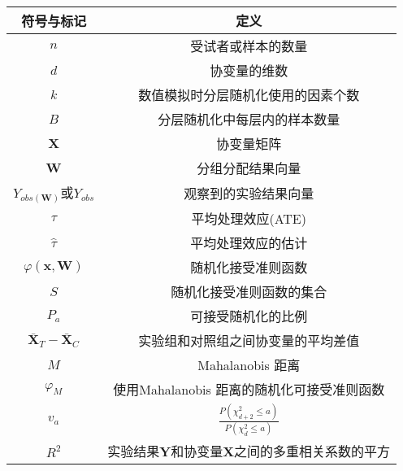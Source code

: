 
\label{chap:symbol}


\begin{table}[h]
	\begin{center}
		\begin{tabular}{cc}
			\toprule[1.5pt]
			符号与标记&定义\\
			\midrule[1pt]
            $n$ & 受试者或样本的数量\\
            $d$ & 协变量的维数 \\
            $k$ & 数值模拟时分层随机化使用的因素个数\\
            $B$ & 分层随机化中每层内的样本数量\\
			$\mathbf{X}$& 协变量矩阵\\
			$\mathbf{{W}}$& 分组分配结果向量\\
			$Y_{obs(\mathbf{W})}$或$Y_{obs}$& 观察到的实验结果向量\\
			$\tau$& 平均处理效应(ATE)\\
			$\hat{\tau}$&平均处理效应的估计\\
			$\varphi(\mathbf{x}, \mathbf{W})$&随机化接受准则函数 \\
			$S$&随机化接受准则函数的集合\\
			$P_a$& 可接受随机化的比例\\
            $\bar{\mathbf{X}}_T - \bar{\mathbf{X}}_C$ & 实验组和对照组之间协变量的平均差值\\
			$M$& Mahalanobis 距离\\
			$\varphi_M$& 使用Mahalanobis 距离的随机化可接受准则函数\\
			$v_a$&$\frac{P\left(\chi_{d+2}^2 \leq a\right)}{P\left(\chi_d^2 \leq a\right)}$\\
			$R^2$&实验结果$\mathbf{Y}$和协变量$\mathbf{X}$之间的多重相关系数的平方\\
			\bottomrule[1.5pt]
		\end{tabular}
	\end{center}
\end{table}